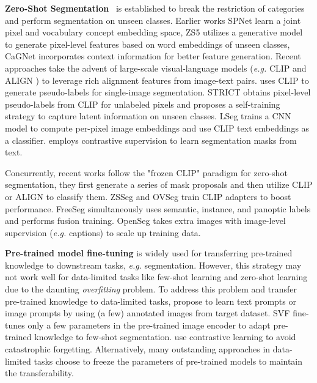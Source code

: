 \noindent \textbf{Zero-Shot Segmentation}~\cite{shaban2017one} is established to break the restriction of categories and perform segmentation on unseen classes.
Earlier works SPNet \cite{spnet} learn a joint pixel and vocabulary concept embedding space, ZS5 \cite{zs5} utilizes a generative model to generate pixel-level features based on word embeddings of unseen classes, CaGNet \cite{cagnet} incorporates context information for better feature generation.
Recent approaches take the advent of large-scale visual-language models (\textit{e.g.} CLIP \cite{radford2021learning} and ALIGN \cite{jia2021scaling}) to leverage rich alignment features from image-text pairs.
\cite{zabari2021semantic} uses CLIP to generate pseudo-labels for single-image segmentation. STRICT \cite{STRICT} obtains pixel-level pseudo-labels from CLIP for unlabeled pixels and proposes a self-training strategy to capture latent information on unseen classes. LSeg \cite{ghiasi2021open} trains a CNN model to compute per-pixel image embeddings and use CLIP text embeddings as a classifier. \cite{xu2022groupvit} employs contrastive supervision to learn segmentation masks from text.

Concurrently, recent works \cite{zegformer, zsseg, freeseg, ovseg, ghiasi2022scaling} follow the "frozen CLIP" paradigm for zero-shot segmentation, they first generate a series of mask proposals and then utilize CLIP \cite{radford2021learning} or ALIGN \cite{jia2021scaling} to classify them. ZSSeg and OVSeg \cite{zsseg, ovseg} train CLIP adapters to boost performance. FreeSeg\cite{freeseg} simultaneously uses semantic, instance, and panoptic labels and performs fusion training. OpenSeg\cite{ghiasi2022scaling} takes extra images with image-level supervision (\textit{e.g.} captions) to scale up training data. 

\noindent \textbf{Pre-trained model fine-tuning}
is widely used for transferring pre-trained knowledge to downstream tasks, \textit{e.g.} segmentation. However, this strategy may not work well for data-limited tasks like few-shot learning and zero-shot learning due to the daunting \textit{overfitting} problem.
To address this problem and transfer pre-trained knowledge to data-limited tasks, \cite{zhou2022learning, zhou2022conditional, guo2022texts, zsseg, ovseg, freeseg} propose to learn text prompts or image prompts by using (a few) annotated images from target dataset. SVF \cite{svf}  fine-tunes only a few parameters in the pre-trained image encoder to adapt pre-trained knowledge to few-shot segmentation. \cite{zhangcoinseg, zhang2022mining} use contrastive learning to avoid catastrophic forgetting. Alternatively, many outstanding approaches in data-limited tasks \cite{hsnet, cyctr, mmformer, zegformer, zsseg} choose to freeze the parameters of pre-trained models to maintain the transferability.

